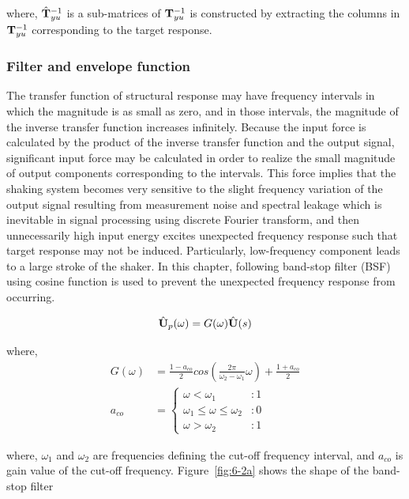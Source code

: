 where, $\hat{\mathbf{T}}_{yu}^{-1}$ is a sub-matrices of $\mathbf{T}_{yu}^{-1}$ is constructed by extracting the columns in $\mathbf{T}_{yu}^{-1}$ corresponding to the target response.

\subsubsection{Filter and envelope function}
The transfer function of structural response may have frequency intervals in which the magnitude is as small as zero, and in those intervals, the magnitude of the inverse transfer function increases infinitely. Because the input force is calculated by the product of the inverse transfer function and the output signal, significant input force may be calculated in order to realize the small magnitude of output components corresponding to the intervals. This force implies that the shaking system becomes very sensitive to the slight frequency variation of the output signal resulting from measurement noise and spectral leakage which is inevitable in signal processing using discrete Fourier transform, and then unnecessarily high input energy excites unexpected frequency response such that target response may not be induced. Particularly, low-frequency component leads to a large stroke of the shaker. In this chapter, following band-stop filter (BSF) using cosine function is used to prevent the unexpected frequency response from occurring.

\begin{equation}\label{eq:6-5}
\hat{\mathbf{U}}_{p}(\omega) = G(\omega)\hat{\mathbf{U}}(s)
\end{equation}

where,
\begin{align}
G(\omega) &= \frac{1-a_{co}}{2}cos \left( \frac{2\pi}{\omega_{2}-\omega_{1}}\omega \right) + \frac{1+a_{co}}{2}\label{eq:6-6}\\
a_{co} &=\left\{\begin{array}{lr} \omega < \omega_{1} &: 1 \\ \omega_{1} \leq \omega \leq \omega_{2} &: 0 \\ \omega > \omega_{2} &: 1\end{array} \right.
\label{eq:6-7}
\end{align}

where, $\omega_{1}$ and $\omega_{2}$ are frequencies defining the cut-off frequency interval, and $a_{co}$ is gain value of the cut-off frequency. Figure~\ref{fig:6-2a} shows the shape of the band-stop filter

